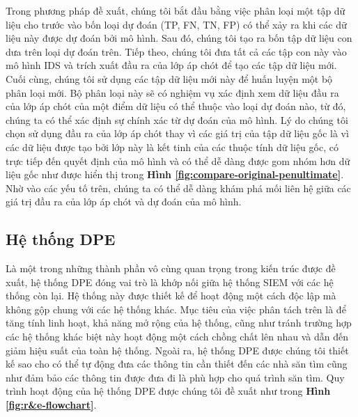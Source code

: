 \bigbreak\noindent
Trong phương pháp đề xuất, chúng tôi bắt đầu bằng việc phân loại một tập dữ liệu cho trước vào bốn loại dự đoán (TP, FN, TN, FP) có thể xảy ra khi các dữ liệu này được dự đoán bởi mô hình. Sau đó, chúng tôi tạo ra bốn tập dữ liệu con dưa trên loại dự đoán trên. Tiếp theo, chúng tôi đưa tất cả các tập con này vào mô hình IDS và trích xuất đầu ra của lớp áp chót để tạo các tập dữ liệu mới. Cuối cùng, chúng tôi sử dụng các tập dữ liệu mới này để huấn luyện một bộ phân loại mới. Bộ phân loại này sẽ có nghiệm vụ xác định xem dữ liệu đầu ra của lớp áp chót của một điểm dữ liệu có thể thuộc vào loại dự đoán nào, từ đó, chúng ta có thể xác định sự chính xác từ dự đoán của mô hình. Lý do chúng tôi chọn sử dụng đầu ra của lớp áp chót thay vì các giá trị của tập dữ liệu gốc là vì các dữ liệu được tạo bởi lớp này là kết tinh của các thuộc tính dữ liệu gốc, có trực tiếp đến quyết định của mô hình \cite{Goodfellow-et-al-2016} và có thể dễ dàng được gom nhóm hơn dữ liệu gốc như được hiển thị trong \textbf{Hình \ref{fig:compare-original-penultimate}}. Nhờ vào các yếu tố trên, chúng ta có thể dễ dàng khám phá mối liên hệ giữa các giá trị đầu ra của lớp áp chót và dự đoán của mô hình.



\subsection{Hệ thống DPE}
Là một trong những thành phần vô cùng quan trọng trong kiến trúc được đề xuất, hệ thống DPE đóng vai trò là khớp nối giữa hệ thống SIEM với các hệ thống còn lại. Hệ thống này được thiết kế để hoạt động một cách độc lập mà không gộp chung với các hệ thống khác. Mục tiêu của việc phân tách trên là để tăng tính linh hoạt, khả năng mở rộng của hệ thống, cũng như tránh trường hợp các hệ thống khác biệt này hoạt động một cách chồng chất lên nhau và dẫn đến giảm hiệu suất của toàn hệ thống. Ngoài ra, hệ thống DPE được chúng tôi thiết kế sao cho có thể tự động đưa các thông tin cần thiết đến các nhà săn tìm cũng như đảm bảo các thông tin được đưa đi là phù hợp cho quá trình săn tìm. Quy trình hoạt động của hệ thống DPE được chúng tôi đề xuất như trong \textbf{Hình \ref{fig:r&e-flowchart}}.

